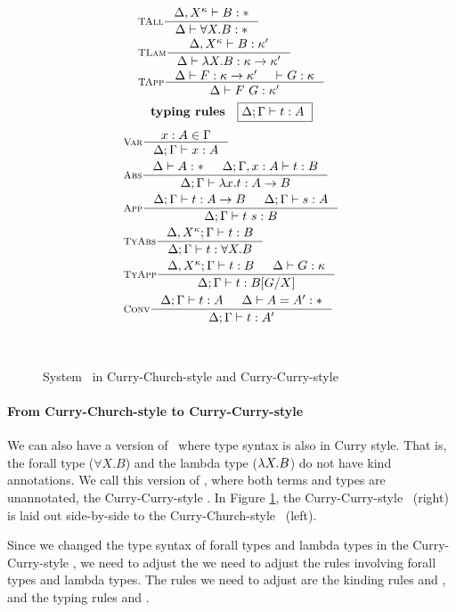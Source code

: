 \begin{figure}
\begin{singlespace}
\begin{minipage}{.46\textwidth}
\begin{align*}
& \inference[\sc TAll]{\Delta,X^\kappa |- B:*}{\Delta |- \forall X.B:*} \\
& \inference[\sc TLam]{\Delta,X^\kappa |- B:\kappa'}
		      {\Delta |- \l X.B:\kappa -> \kappa'} \\
& \inference[\sc TApp]{\Delta |- F : \kappa -> \kappa' & |- G : \kappa}
		      {\Delta |- F ~ G : \kappa'} \\
\end{align*}
\[ \textbf{typing rules} \quad \framebox{$ \Delta;\Gamma |- t : A $ } \]
\vspace*{-1em}
\begin{align*}
& \inference[\sc Var]{x:A \in \Gamma}{\Delta;\Gamma |- x:A} \\
& \inference[\sc Abs]{\Delta |- A:* & \Delta;\Gamma,x:A |- t : B}
		     {\Delta;\Gamma |- \l x   .t : A -> B} \\
& \inference[\sc App]{\Delta;\Gamma |- t : A -> B & \Delta;\Gamma |- s : A}
		     {\Delta;\Gamma |- t~s : B} \\
& \inference[\sc TyAbs]{\Delta,X^\kappa;\Gamma |- t : B}
		       {\Delta;\Gamma |- t : \forall X.B} \\
& \inference[\sc TyApp]{\Delta,X^\kappa;\Gamma |- t : B & \Delta |- G:\kappa}
		       {\Delta;\Gamma |- t : B[G/X]} \\
& \inference[\sc Conv]{\Delta;\Gamma |- t : A & \Delta |- A = A' : *}
		      {\Delta;\Gamma |- t : A'}
\end{align*}
\end{minipage}
~\\
\caption{System \Fw\ in Curry-Church-style and Curry-Curry-style}
\label{fig:fw2}
\end{singlespace}
\end{figure}


\paragraph{From Curry-Church-style to Curry-Curry-style}
We can also have a version of \Fw\ where type syntax is also in Curry style.
That is, the forall type ($\forall X.B$) and the lambda type ($\lambda X.B$)
do not have kind annotations. We call this version of \Fw, where both terms
and types are unannotated, the Curry-Curry-style \Fw.
In Figure \ref{fig:fw2}, the Curry-Curry-style \Fw\ (right) is laid out
side-by-side to the Curry-Church-style \Fw\ (left).

Since we changed the type syntax of forall types and lambda types in
the Curry-Curry-style \Fw, we need to adjust the we need to adjust the rules
involving forall types and lambda types. The rules we need to adjust are
the kinding rules  and , and
the typing rules  and .

